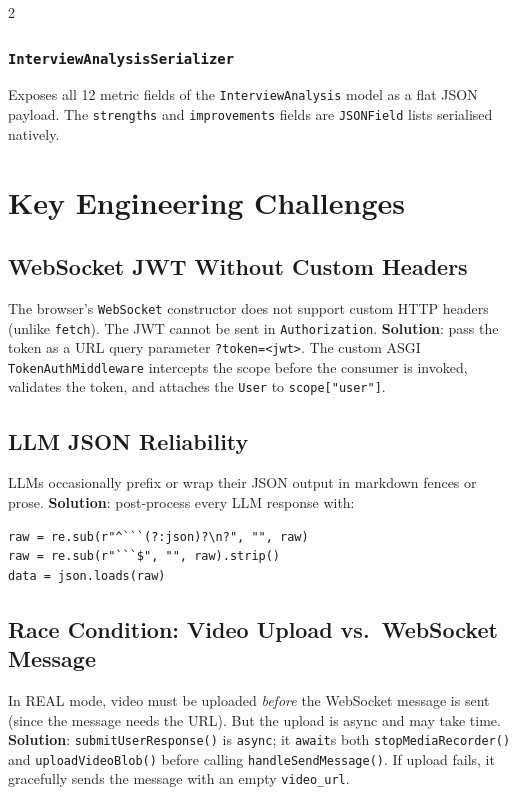 \documentclass[10pt, a4paper]{article}
\begin{document}
\begin{multicols}{2}
\subsubsection{\texttt{InterviewAnalysisSerializer}}
Exposes all 12 metric fields of the \texttt{InterviewAnalysis} model
as a flat JSON payload. The \texttt{strengths} and \texttt{improvements}
fields are \texttt{JSONField} lists serialised natively.

\section{Key Engineering Challenges}

\subsection{WebSocket JWT Without Custom Headers}
The browser's \texttt{WebSocket} constructor does not support custom HTTP
headers (unlike \texttt{fetch}). The JWT cannot be sent in
\texttt{Authorization}. \textbf{Solution}: pass the token as a URL query
parameter \texttt{?token=<jwt>}. The custom ASGI
\texttt{TokenAuthMiddleware} intercepts the scope before the consumer
is invoked, validates the token, and attaches the \texttt{User} to
\texttt{scope["user"]}.

\subsection{LLM JSON Reliability}
LLMs occasionally prefix or wrap their JSON output in markdown fences
or prose. \textbf{Solution}: post-process every LLM response with:
\begin{codebox}
\footnotesize
\begin{verbatim}
raw = re.sub(r"^```(?:json)?\n?", "", raw)
raw = re.sub(r"```$", "", raw).strip()
data = json.loads(raw)
\end{verbatim}
\end{codebox}

\subsection{Race Condition: Video Upload vs.\ WebSocket Message}
In REAL mode, video must be uploaded \textit{before} the WebSocket
message is sent (since the message needs the URL). But the upload is
async and may take time. \textbf{Solution}: \texttt{submitUserResponse()}
is \texttt{async}; it \texttt{await}s both \texttt{stopMediaRecorder()} and
\texttt{uploadVideoBlob()} before calling \texttt{handleSendMessage()}.
If upload fails, it gracefully sends the message with an empty
\texttt{video\_url}.


\end{multicols}
\end{document}
